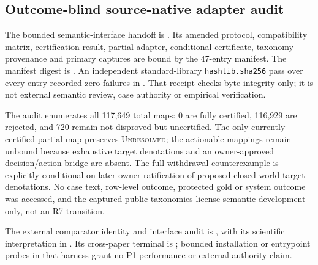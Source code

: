 \subsection{Outcome-blind source-native adapter audit}
The bounded semantic-interface handoff is
. Its amended
protocol, compatibility matrix, certification result, partial adapter,
conditional certificate, taxonomy provenance and primary captures are bound by
the 47-entry  manifest. The manifest digest is
.
An independent standard-library \texttt{hashlib.sha256} pass over every entry
recorded zero failures in
.
That receipt checks byte integrity only; it is not external semantic review,
case authority or empirical verification.

The audit enumerates all 117,649 total maps: 0 are fully certified, 116,929 are
rejected, and 720 remain not disproved but uncertified. The only currently
certified partial map preserves \textsc{Unresolved}; the actionable mappings
remain unbound because exhaustive target denotations and an owner-approved
decision/action bridge are absent. The full-withdrawal counterexample is
explicitly conditional on later owner-ratification of proposed closed-world
target denotations. No case text, row-level outcome, protected gold or system
outcome was accessed, and the captured public taxonomies license semantic
development only, not an R7 transition.

The external comparator identity and interface audit is
,
with its scientific interpretation in
.
Its cross-paper terminal is ; bounded
installation or entrypoint probes in that harness grant no P1 performance or
external-authority claim.

